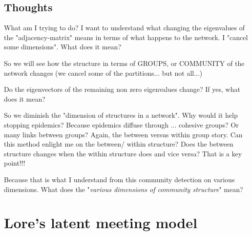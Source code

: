 \documentclass[12pt]{article}
\begin{document}
\subsection{Thoughts}
{ \scriptsize { \color{Orchid} What am I trying to do? I want to understand what changing the eigenvalues of the "adjacency-matrix" means in terms of what happens to the network. I "cancel some dimensions". What does it mean?

So we will see how the structure in terms of GROUPS, or COMMUNITY of the network changes (we cancel some of the partitions... but not all...)

Do the eigenvectors of the remaining non zero eigenvalues change? If yes, what does it mean?

So we diminish the "dimension of structures in a network". Why would it help stopping epidemics? Because epidemics diffuse through ... cohesive groups? Or many links between groups? Again, the between versus within group story. Can this method enlight me on the between/ within structure? Does the between structure changes when the within structure does and vice versa? That is a key point!!! 

Because that is what I understand from this community detection on various dimensions. What does the "\textit{various dimensions of community structure}" mean?   \par } }




































\section{Lore's latent meeting model}

\cite{308_Gal_Rogers}
\end{document}

